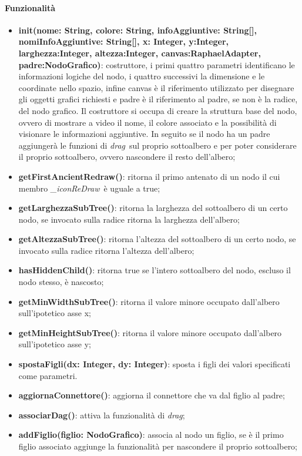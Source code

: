 \paragraph{Funzionalità}
\begin{itemize}
\item \textbf{init(nome: String, colore: String, infoAggiuntive: String[], nomiInfoAggiuntive: String[], x: Integer, y:Integer, larghezza:Integer, altezza:Integer, canvas:RaphaelAdapter, padre:NodoGrafico)}: costruttore, i primi quattro parametri identificano le informazioni logiche del nodo, i quattro successivi la dimensione e le coordinate nello spazio, infine canvas è il riferimento utilizzato per disegnare gli oggetti grafici richiesti e padre è il riferimento al padre, se non è la radice, del nodo grafico. Il costruttore si occupa di creare la struttura base del nodo, ovvero di mostrare a video il nome, il colore associato e la possibilità di visionare le informazioni aggiuntive. In seguito se il nodo ha un padre aggiungerà le funzioni di \textit{drag}\ sul proprio sottoalbero e per poter considerare il proprio sottoalbero, ovvero nascondere il resto dell'albero;
\item \textbf{getFirstAncientRedraw()}: ritorna il primo antenato di un nodo il cui membro \textit{\_iconReDraw}\ è uguale a true;
\item \textbf{getLarghezzaSubTree()}: ritorna la larghezza del sottoalbero di un certo nodo, se invocato sulla radice ritorna la larghezza dell'albero;
\item \textbf{getAltezzaSubTree()}: ritorna l'altezza del sottoalbero di un certo nodo, se invocato sulla radice ritorna l'altezza dell'albero;
\item \textbf{hasHiddenChild()}: ritorna true se l'intero sottoalbero del nodo, escluso il nodo stesso, è nascosto;
\item \textbf{getMinWidthSubTree()}: ritorna il valore minore occupato dall'albero sull'ipotetico asse x;
\item \textbf{getMinHeightSubTree()}: ritorna il valore minore occupato dall'albero sull'ipotetico asse y;
\item \textbf{spostaFigli(dx: Integer, dy: Integer)}: sposta i figli dei valori specificati come parametri.
\item \textbf{aggiornaConnettore()}: aggiorna il connettore che va dal figlio al padre;
\item \textbf{associarDag()}: attiva la funzionalità di \textit{drag};
\item \textbf{addFiglio(figlio: NodoGrafico)}: associa al nodo un figlio, se è il primo figlio associato aggiunge la funzionalità per nascondere il proprio sottoalbero;

\end{itemize}
